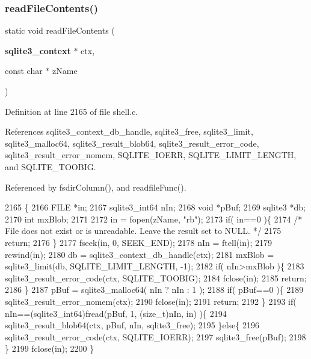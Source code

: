 \subsubsection{read\+File\+Contents()}
{\footnotesize\ttfamily static void read\+File\+Contents (\begin{DoxyParamCaption}\item[{\textbf{ sqlite3\+\_\+context} $\ast$}]{ctx,  }\item[{const char $\ast$}]{z\+Name }\end{DoxyParamCaption})\hspace{0.3cm}{\ttfamily [static]}}



Definition at line 2165 of file shell.\+c.



References sqlite3\+\_\+context\+\_\+db\+\_\+handle, sqlite3\+\_\+free, sqlite3\+\_\+limit, sqlite3\+\_\+malloc64, sqlite3\+\_\+result\+\_\+blob64, sqlite3\+\_\+result\+\_\+error\+\_\+code, sqlite3\+\_\+result\+\_\+error\+\_\+nomem, S\+Q\+L\+I\+T\+E\+\_\+\+I\+O\+E\+RR, S\+Q\+L\+I\+T\+E\+\_\+\+L\+I\+M\+I\+T\+\_\+\+L\+E\+N\+G\+TH, and S\+Q\+L\+I\+T\+E\+\_\+\+T\+O\+O\+B\+IG.



Referenced by fsdir\+Column(), and readfile\+Func().


\begin{DoxyCode}
2165                                                                      \{
2166   FILE *in;
2167   sqlite3_int64 nIn;
2168   \textcolor{keywordtype}{void} *pBuf;
2169   sqlite3 *db;
2170   \textcolor{keywordtype}{int} mxBlob;
2171 
2172   in = fopen(zName, \textcolor{stringliteral}{"rb"});
2173   \textcolor{keywordflow}{if}( in==0 )\{
2174     \textcolor{comment}{/* File does not exist or is unreadable. Leave the result set to NULL. */}
2175     \textcolor{keywordflow}{return};
2176   \}
2177   fseek(in, 0, SEEK\_END);
2178   nIn = ftell(in);
2179   rewind(in);
2180   db = sqlite3_context_db_handle(ctx);
2181   mxBlob = sqlite3_limit(db, SQLITE_LIMIT_LENGTH, -1);
2182   \textcolor{keywordflow}{if}( nIn>mxBlob )\{
2183     sqlite3_result_error_code(ctx, SQLITE_TOOBIG);
2184     fclose(in);
2185     \textcolor{keywordflow}{return};
2186   \}
2187   pBuf = sqlite3_malloc64( nIn ? nIn : 1 );
2188   \textcolor{keywordflow}{if}( pBuf==0 )\{
2189     sqlite3_result_error_nomem(ctx);
2190     fclose(in);
2191     \textcolor{keywordflow}{return};
2192   \}
2193   \textcolor{keywordflow}{if}( nIn==(sqlite3_int64)fread(pBuf, 1, (\textcolor{keywordtype}{size\_t})nIn, in) )\{
2194     sqlite3_result_blob64(ctx, pBuf, nIn, sqlite3_free);
2195   \}\textcolor{keywordflow}{else}\{
2196     sqlite3_result_error_code(ctx, SQLITE_IOERR);
2197     sqlite3_free(pBuf);
2198   \}
2199   fclose(in);
2200 \}
\end{DoxyCode}
\mbox{\label{shell_8c_a55e9c691f5db117b63ac1f8912663eaa}} 
